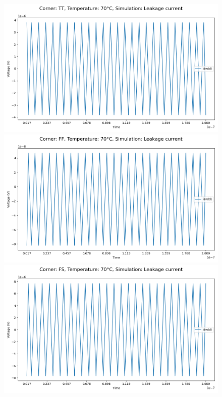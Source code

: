 \begin{figure}[H]
    \centering
    \includegraphics[height= 0.21\textheight]{figures/aimspice/TT/70/I.csv.png}
    \vspace{5pt}
    \includegraphics[height= 0.21\textheight]{figures/aimspice/FF/70/I.csv.png}
    \vspace{5pt}
    \includegraphics[height= 0.21\textheight]{figures/aimspice/FS/70/I.csv.png}

\end{figure}
